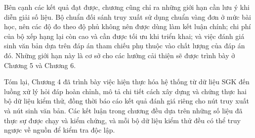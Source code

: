 \documentclass[../DoAn.tex]{subfiles}
\begin{document}
Bên cạnh các kết quả đạt được, chương cũng chỉ ra những giới hạn cần lưu ý khi diễn giải số liệu. Bộ chuẩn đối sánh truy xuất sử dụng chuẩn vàng đơn ở mức bài học, nên các độ đo theo độ phủ không nên được dùng làm kết luận chính; chi phí của bộ xếp hạng lại còn cao và cần được tối ưu khi triển khai; và việc đánh giá sinh văn bản dựa trên đáp án tham chiếu phụ thuộc vào chất lượng của đáp án đó. Những giới hạn này là cơ sở cho các hướng cải thiện sẽ được trình bày ở Chương 5 và Chương 6.

Tóm lại, Chương 4 đã trình bày việc hiện thực hóa hệ thống từ dữ liệu SGK đến luồng xử lý hỏi đáp hoàn chỉnh, mô tả chi tiết cách xây dựng và chứng thực hai bộ dữ liệu kiểm thử, đồng thời báo cáo kết quả đánh giá riêng cho nút truy xuất và nút sinh văn bản. Các kết luận trong chương đều dựa trên những số liệu đã thực sự được chạy và kiểm chứng, và mỗi bộ dữ liệu kiểm thử đều có thể truy ngược về nguồn để kiểm tra độc lập.
\end{document}
